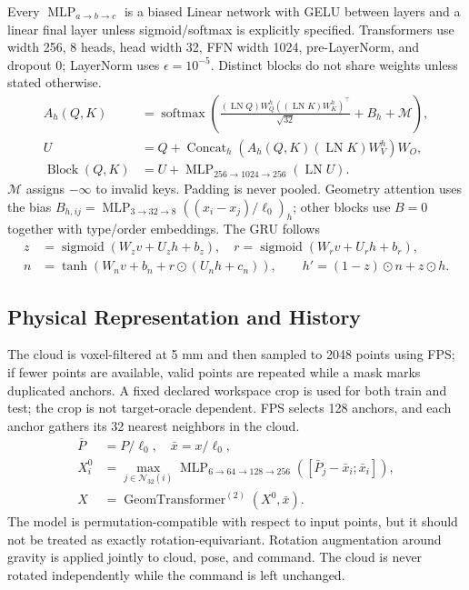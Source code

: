 \documentclass[
  10pt,
]{article}
\begin{document}
Every \(\operatorname{MLP}_{a\to b\to c}\) is a biased Linear network with GELU between layers and a linear final layer unless sigmoid/softmax is explicitly specified. Transformers use width 256, 8 heads, head width 32, FFN width 1024, pre-LayerNorm, and dropout 0; LayerNorm uses \(\epsilon=10^{-5}\). Distinct blocks do not share weights unless stated otherwise.
\begin{equation}\label{eq:attn}
\begin{aligned}
A_h(Q,K)&=\operatorname{softmax}\left(\frac{(\operatorname{LN}Q)W_Q^h((\operatorname{LN}K)W_K^h)^\top}{\sqrt{32}}+B_h+\mathcal M\right),\\
U&=Q+\operatorname{Concat}_h\left(A_h(Q,K)(\operatorname{LN}K)W_V^h\right)W_O,\\
\operatorname{Block}(Q,K)&=U+\operatorname{MLP}_{256\to1024\to256}(\operatorname{LN}U).
\end{aligned}
\end{equation}
\(\mathcal M\) assigns \(-\infty\) to invalid keys. Padding is never pooled. Geometry attention uses the bias
\(B_{h,ij}=\operatorname{MLP}_{3\to32\to8}((x_i-x_j)/\ell_0)_h\); other blocks use \(B=0\) together with type/order embeddings. The GRU follows
\begin{equation}\label{eq:gru}
\begin{aligned}
z&=\operatorname{sigmoid}(W_zv+U_zh+b_z),\quad r=\operatorname{sigmoid}(W_rv+U_rh+b_r),\\
n&=\tanh(W_nv+b_n+r\odot(U_nh+c_n)),\qquad h'=(1-z)\odot n+z\odot h.
\end{aligned}
\end{equation}

\hypertarget{biux1ec3u-diux1ec5n-vux1eadt-luxfd-vuxe0-lux1ecbch-sux1eed}{%
\subsection{Physical Representation and History}\label{biux1ec3u-diux1ec5n-vux1eadt-luxfd-vuxe0-lux1ecbch-sux1eed}}

The cloud is voxel-filtered at 5 mm and then sampled to 2048 points using FPS; if fewer points are available, valid points are repeated while a mask marks duplicated anchors. A fixed declared workspace crop is used for both train and test; the crop is not target-oracle dependent. FPS selects 128 anchors, and each anchor gathers its 32 nearest neighbors in the cloud.
\begin{equation}\label{eq:encoder}
\begin{aligned}
\bar P&=P/\ell_0,\quad\bar x=x/\ell_0,\\
X_i^0&=\max_{j\in\mathcal N_{32}(i)}\operatorname{MLP}_{6\to64\to128\to256}([\bar P_j-\bar x_i;\bar x_i]),\\
X&=\operatorname{GeomTransformer}^{(2)}(X^0,\bar x).
\end{aligned}
\end{equation}
The model is permutation-compatible with respect to input points, but it should not be treated as exactly rotation-equivariant. Rotation augmentation around gravity is applied jointly to cloud, pose, and command. The cloud is never rotated independently while the command is left unchanged.
\end{document}
